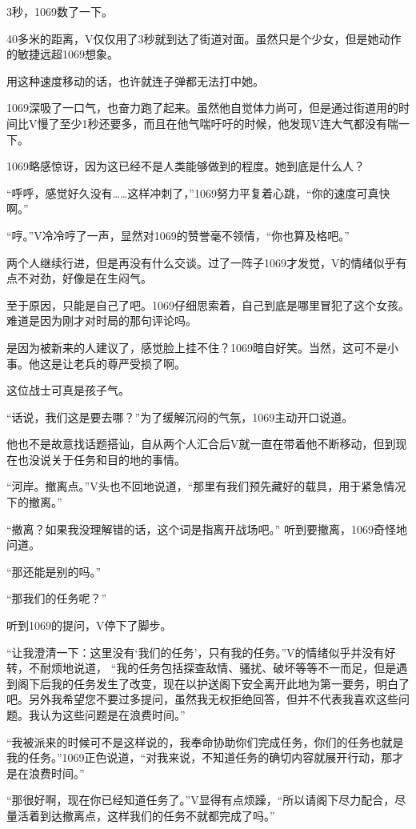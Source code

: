3秒，1069数了一下。

40多米的距离，V仅仅用了3秒就到达了街道对面。虽然只是个少女，但是她动作的敏捷远超1069想象。

用这种速度移动的话，也许就连子弹都无法打中她。

1069深吸了一口气，也奋力跑了起来。虽然他自觉体力尚可，但是通过街道用的时间比V慢了至少1秒还要多，而且在他气喘吁吁的时候，他发现V连大气都没有喘一下。

1069略感惊讶，因为这已经不是人类能够做到的程度。她到底是什么人？

“呼呼，感觉好久没有……这样冲刺了，”1069努力平复着心跳，“你的速度可真快啊。”

“哼。”V冷冷哼了一声，显然对1069的赞誉毫不领情，“你也算及格吧。”

两个人继续行进，但是再没有什么交谈。过了一阵子1069才发觉，V的情绪似乎有点不对劲，好像是在生闷气。

至于原因，只能是自己了吧。1069仔细思索着，自己到底是哪里冒犯了这个女孩。难道是因为刚才对时局的那句评论吗。

是因为被新来的人建议了，感觉脸上挂不住？1069暗自好笑。当然，这可不是小事。他这是让老兵的尊严受损了啊。

这位战士可真是孩子气。

“话说，我们这是要去哪？”为了缓解沉闷的气氛，1069主动开口说道。

他也不是故意找话题搭讪，自从两个人汇合后V就一直在带着他不断移动，但到现在也没说关于任务和目的地的事情。

“河岸。撤离点。”V头也不回地说道，“那里有我们预先藏好的载具，用于紧急情况下的撤离。”

“撤离？如果我没理解错的话，这个词是指离开战场吧。” 听到要撤离，1069奇怪地问道。

“那还能是别的吗。”

“那我们的任务呢？”

听到1069的提问，V停下了脚步。

“让我澄清一下：这里没有‘我们的任务’，只有我的任务。”V的情绪似乎并没有好转，不耐烦地说道， “我的任务包括探查敌情、骚扰、破坏等等不一而足，但是遇到阁下后我的任务发生了改变，现在以护送阁下安全离开此地为第一要务，明白了吧。另外我希望您不要过多提问，虽然我无权拒绝回答，但并不代表我喜欢这些问题。我认为这些问题是在浪费时间。”

“我被派来的时候可不是这样说的，我奉命协助你们完成任务，你们的任务也就是我的任务。”1069正色说道，“对我来说，不知道任务的确切内容就展开行动，那才是在浪费时间。”

“那很好啊，现在你已经知道任务了。”V显得有点烦躁，“所以请阁下尽力配合，尽量活着到达撤离点，这样我们的任务不就都完成了吗。”

